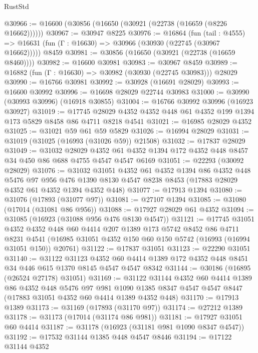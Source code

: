 \begin{lexlean}{RustStd}
\begin{coremodule}
@30966 := @16600 (@30856 (@16650 (@30921 (@22738 (@16659 (@8226 @16662))))))
@30967 := @30947 @8225
@30976 := @16864
    (fun (tail : @4555) => @16631 (fun (Γ : @16630) => @30966 (@30930 (@22745 (@30967 @16662)))))
    @8459
@30981 := @30856 (@16650 (@30921 (@22738 (@16659 @8460))))
@30982 := @16600 @30981
@30983 := @30967 @8459
@30989 := @16882 (fun (Γ : @16630) => @30982 (@30930 (@22745 @30983))) @28029
@30990 := @16766 @30981
@30992 := @30928 (@16691 @28029)
@30993 := @16600 @30992
@30996 := @16698 @28029 @22744 @30983
@31000 := @30990 (@30993 @30996) (@16918 @30855)
@31004 := @16766 @30992 @30996 (@16923 @30927)
@31019 := @17745 @28029 @4352 @4352 @448 @61 @4352 @199 @1394 @173 @5829 @8458 @86 @4711 @8218 @4541
@31021 := @16985 @28029 @4352
@31025 := @31021 @59 @61 @59 @5829
@31026 := @16994 @28029
@31031 := @31019 (@31025 (@16993 (@31026 @59)) @21508)
@31032 := @17837 @28029
@31049 := @31032
    @28029
    @4352
    @61
    @4352
    @1394
    @172
    @4352
    @448
    @8457
    @34
    @450
    @86
    @688
    @4755
    @4547
    @4547
    @6169
@31051 := @22293 (@30092 @28029)
@31076 := @31032
    @31051
    @4352
    @61
    @4352
    @1394
    @86
    @4352
    @448
    @5476
    @97
    @956
    @476
    @1390
    @8130
    @4547
    @8238
    @8453
    (@17883 @28029 @4352 @61 @4352 @1394 @4352 @448)
@31077 := @17913 @1394
@31080 := @31076 (@17893 (@31077 @97))
@31081 := @27107 @1394
@31085 := @31080 (@17014 (@31081 @86 @956))
@31088 := @17927 @28029 @61 @4352
@31094 := @31085 (@16923 (@31088 @956 @476 @8130 @4547))
@31121 := @17745
    @31051
    @4352
    @4352
    @448
    @60
    @4414
    @207
    @1389
    @173
    @5742
    @8452
    @86
    @4711
    @8231
    @4541
    (@16985 @31051 @4352 @150 @60 @150 @5742 (@16993 (@16994 @31051 @150)) @20761)
@31122 := @17837 @31051
@31123 := @22290 @31051
@31140 := @31122
    @31123
    @4352
    @60
    @4414
    @1389
    @172
    @4352
    @448
    @8451
    @34
    @446
    @615
    @1370
    @8145
    @4547
    @4547
    @8342
@31144 := @30186 (@16895 (@26524 @27178) @31051)
@31169 := @31122
    @31144
    @4352
    @60
    @4414
    @1389
    @86
    @4352
    @448
    @5476
    @97
    @981
    @1090
    @1385
    @8347
    @4547
    @4547
    @8447
    (@17883 @31051 @4352 @60 @4414 @1389 @4352 @448)
@31170 := @17913 @1389
@31173 := @31169 (@17893 (@31170 @97))
@31174 := @27212 @1389
@31178 := @31173 (@17014 (@31174 @86 @981))
@31181 := @17927 @31051 @60 @4414
@31187 := @31178 (@16923 (@31181 @981 @1090 @8347 @4547))
@31192 := @17532 @31144 @1385 @448 @4547 @8446
@31194 := @17122 @31144 @4352

\end{coremodule}
\end{lexlean}
